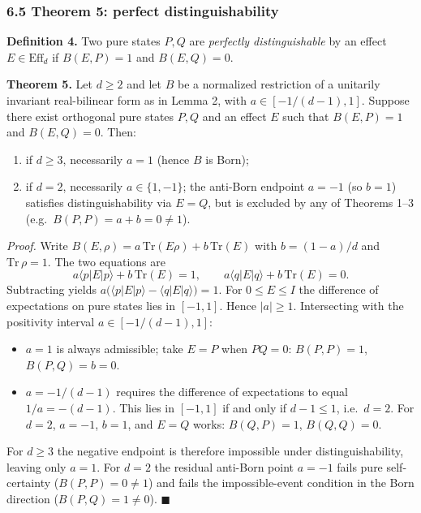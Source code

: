 \documentclass[
]{article}
\providecommand{\tightlist}{%
  \setlength{\itemsep}{0pt}\setlength{\parskip}{0pt}}
\begin{document}
\subsubsection{6.5 Theorem 5: perfect
distinguishability}\label{theorem-5-perfect-distinguishability}

\textbf{Definition 4.} Two pure states \(P,Q\) are \emph{perfectly
distinguishable} by an effect \(E\in\mathrm{Eff}_d\) if \(B(E,P)=1\) and
\(B(E,Q)=0\).

\textbf{Theorem 5.} Let \(d\geq 2\) and let \(B\) be a normalized
restriction of a unitarily invariant real-bilinear form as in Lemma 2,
with \(a\in[-1/(d-1),1]\). Suppose there exist orthogonal pure states
\(P,Q\) and an effect \(E\) such that \(B(E,P)=1\) and \(B(E,Q)=0\).
Then:

\begin{enumerate}
\def\labelenumi{\arabic{enumi}.}
\tightlist
\item
  if \(d\geq 3\), necessarily \(a=1\) (hence \(B\) is Born);
\item
  if \(d=2\), necessarily \(a\in\{1,-1\}\); the anti-Born endpoint
  \(a=-1\) (so \(b=1\)) satisfies distinguishability via \(E=Q\), but is
  excluded by any of Theorems 1--3 (e.g.~\(B(P,P)=a+b=0\neq 1\)).
\end{enumerate}

\emph{Proof.} Write
\(B(E,\rho)=a\,\mathrm{Tr}(E\rho)+b\,\mathrm{Tr}(E)\) with \(b=(1-a)/d\)
and \(\mathrm{Tr}\,\rho=1\). The two equations are
\[a\langle p|E|p\rangle+b\,\mathrm{Tr}(E)=1,\qquad a\langle q|E|q\rangle+b\,\mathrm{Tr}(E)=0.\]
Subtracting yields
\(a\bigl(\langle p|E|p\rangle-\langle q|E|q\rangle\bigr)=1\). For
\(0\leq E\leq I\) the difference of expectations on pure states lies in
\([-1,1]\). Hence \(|a|\geq 1\). Intersecting with the positivity
interval \(a\in[-1/(d-1),1]\):

\begin{itemize}
\tightlist
\item
  \(a=1\) is always admissible; take \(E=P\) when \(PQ=0\):
  \(B(P,P)=1\), \(B(P,Q)=b=0\).
\item
  \(a=-1/(d-1)\) requires the difference of expectations to equal
  \(1/a=-(d-1)\). This lies in \([-1,1]\) if and only if \(d-1\leq 1\),
  i.e.~\(d=2\). For \(d=2\), \(a=-1\), \(b=1\), and \(E=Q\) works:
  \(B(Q,P)=1\), \(B(Q,Q)=0\).
\end{itemize}

For \(d\geq 3\) the negative endpoint is therefore impossible under
distinguishability, leaving only \(a=1\). For \(d=2\) the residual
anti-Born point \(a=-1\) fails pure self-certainty (\(B(P,P)=0\neq 1\))
and fails the impossible-event condition in the Born direction
(\(B(P,Q)=1\neq 0\)). \(\blacksquare\)
\end{document}
